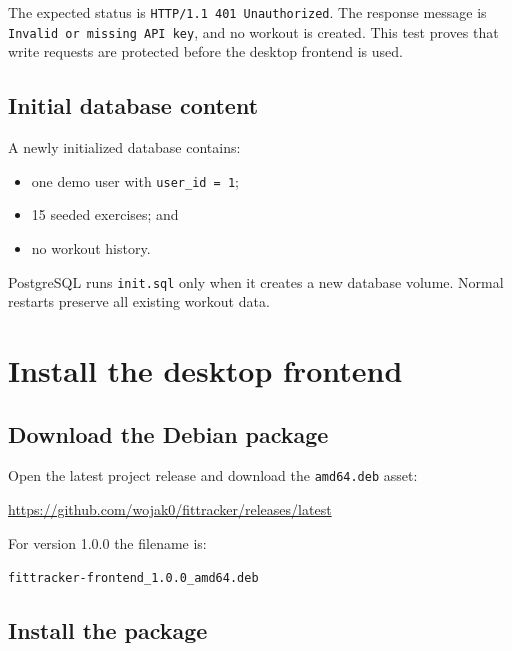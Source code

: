 \documentclass[11pt,a4paper]{article}
\begin{document}
The expected status is \texttt{HTTP/1.1 401 Unauthorized}. The response message
is \texttt{Invalid or missing API key}, and no workout is created. This test
proves that write requests are protected before the desktop frontend is used.

\subsection{Initial database content}

A newly initialized database contains:

\begin{itemize}[leftmargin=1.4em,nosep]
  \item one demo user with \texttt{user\_id = 1};
  \item 15 seeded exercises; and
  \item no workout history.
\end{itemize}

PostgreSQL runs \texttt{init.sql} only when it creates a new database volume.
Normal restarts preserve all existing workout data.

\section{Install the desktop frontend}

\subsection{Download the Debian package}

Open the latest project release and download the \texttt{amd64.deb} asset:

\begin{center}
\url{https://github.com/wojak0/fittracker/releases/latest}
\end{center}

For version 1.0.0 the filename is:

\begin{center}
\texttt{fittracker-frontend\_1.0.0\_amd64.deb}
\end{center}

\subsection{Install the package}
\end{document}
